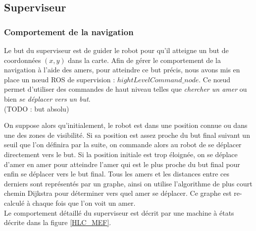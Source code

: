 \documentclass[10pt,a4paper]{article}
\begin{document}
\newpage
\subsection{Superviseur}
\label{sec:Superviseur}

\subsubsection{Comportement de la navigation}

Le but du superviseur est de guider le robot pour qu'il atteigne un but de coordonnées $(x,y)$ dans la carte. Afin de gérer le comportement de la navigation à l'aide des amers, pour atteindre ce but précis, nous avons mis en place un nœud ROS de supervision : $hightLevelCommand\_node$. Ce nœud permet d'utiliser des commandes de haut niveau telles que \textit{chercher un amer} ou bien \textit{se déplacer vers un but}.\\

(TODO : but absolu)

On suppose alors qu'initialement, le robot est dans une position connue ou dans une des zones de visibilité. Si sa position est assez proche du but final suivant un seuil que l'on définira par la suite, on commande alors au robot de se déplacer directement vers le but. Si la position initiale est trop éloignée, on se déplace d'amer en amer pour atteindre l'amer qui est le plus proche du but final pour enfin se déplacer vers le but final. Tous les amers et les distances entre ces derniers sont représentés par un graphe, ainsi on utilise l'algorithme de plus court chemin Dijkstra pour déterminer vers quel amer se déplacer. Ce graphe est re-calculé à chaque fois que l'on voit un amer.\\

Le comportement détaillé du superviseur est décrit par une machine à états décrite dans la figure \ref{HLC_MEF}.
\end{document}
